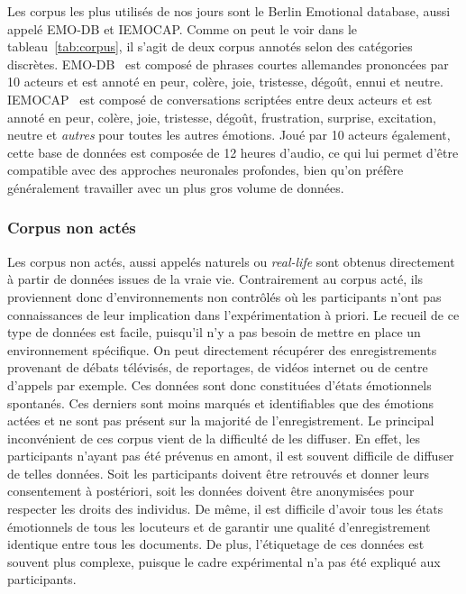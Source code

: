 Les corpus les plus utilisés de nos jours sont le Berlin Emotional database, aussi appelé EMO-DB et IEMOCAP. Comme on peut le voir dans le tableau~\ref{tab:corpus}, il s'agit de deux corpus annotés selon des catégories discrètes. EMO-DB~\cite{Burkhardt2005} est composé de phrases courtes allemandes prononcées par 10 acteurs et est annoté en peur, colère, joie, tristesse, dégoût, ennui et neutre. IEMOCAP~\cite{Busso2007} est composé de conversations scriptées entre deux acteurs et est annoté en peur, colère, joie, tristesse, dégoût, frustration, surprise, excitation, neutre et \textit{autres} pour toutes les autres émotions. Joué par 10 acteurs également, cette base de données est composée de 12 heures d'audio, ce qui lui permet d'être compatible avec des approches neuronales profondes, bien qu'on préfère généralement travailler avec un plus gros volume de données.


\subsubsection{Corpus non actés}
Les corpus non actés, aussi appelés naturels ou \textit{real-life} sont obtenus directement à partir de données issues de la vraie vie. Contrairement au corpus acté, ils proviennent donc d'environnements non contrôlés où les participants n'ont pas connaissances de leur implication dans l'expérimentation à priori. Le recueil de ce type de données est facile, puisqu'il n'y a pas besoin de mettre en place un environnement spécifique. On peut directement récupérer des enregistrements provenant de débats télévisés, de reportages, de vidéos internet ou de centre d'appels par exemple.
Ces données sont donc constituées d'états émotionnels spontanés. Ces derniers sont moins marqués et identifiables que des émotions actées et ne sont pas présent sur la majorité de l'enregistrement. Le principal inconvénient de ces corpus vient de la difficulté de les diffuser. En effet, les participants n'ayant pas été prévenus en amont, il est souvent difficile de diffuser de telles données. Soit les participants doivent être retrouvés et donner leurs consentement à postériori, soit les données doivent être anonymisées pour respecter les droits des individus. De même, il est difficile d'avoir tous les états émotionnels de tous les locuteurs et de garantir une qualité d'enregistrement identique entre tous les documents.
De plus, l'étiquetage de ces données est souvent plus complexe, puisque le cadre expérimental n'a pas été expliqué aux participants.

